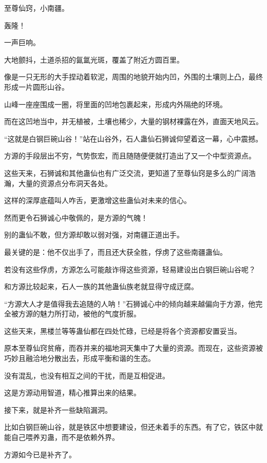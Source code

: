 
\begin{this_body}

至尊仙窍，小南疆。

轰隆！

一声巨响。

大地颤抖，土道杀招的氤氲光斑，覆盖了附近方圆百里。

像是一只无形的大手捏动着软泥，周围的地貌开始内凹，外围的土壤则上凸，最终形成一片圆形山谷。

山峰一座座围成一圈，将里面的凹地包裹起来，形成内外隔绝的环境。

而在这凹地当中，并无植被，土壤也稀少，大量的钢材裸露在外，直面天地风云。

“这就是白钢巨碗山谷！”站在山谷外，石人蛊仙石狮诚仰望着这一幕，心中震撼。

方源的手段层出不穷，气势恢宏，而且随随便便就打造出了又一个中型资源点。

这些天来，石狮诚和其他蛊仙也有广泛交流，更知道了至尊仙窍是多么的广阔浩瀚，大量的资源点分布洞天各处。

这样的深厚底蕴叫人咋舌，更激增这些蛊仙对未来的信心。

然而更令石狮诚心中敬佩的，是方源的气魄！

别的蛊仙不敢，但方源却敢以弱对强，对南疆正道出手。

最关键的是：他不仅出手了，而且还大获全胜，俘虏了这些南疆蛊仙。

若没有这些俘虏，方源怎么可能敲诈得这些资源，轻易建设出白钢巨碗山谷呢？

和方源比较起来，石人一族的其他蛊仙族老就显得守成迂腐。

“方源大人才是值得我去追随的人呐！”石狮诚心中的倾向越来越偏向于方源，他完全被方源的魅力所打动，被他的气度折服。

这些天来，黑楼兰等等蛊仙都在四处忙碌，已经是将各个资源都安置妥当。

原本至尊仙窍贫瘠，而吞并来的福地洞天集中了大量的资源。而现在，这些资源被巧妙且融洽地分散出去，形成平衡和谐的生态。

没有混乱，也没有相互之间的干扰，而是互相促进。

这是方源动用智道，精心推算出来的结果。

接下来，就是补齐一些缺陷漏洞。

比如白钢巨碗山谷，就是铁区中想要建设，但还未着手的东西。有了它，铁区中就能自己喂养刃蛊，而不是依赖外界。

方源如今已是补齐了。


\end{this_body}
